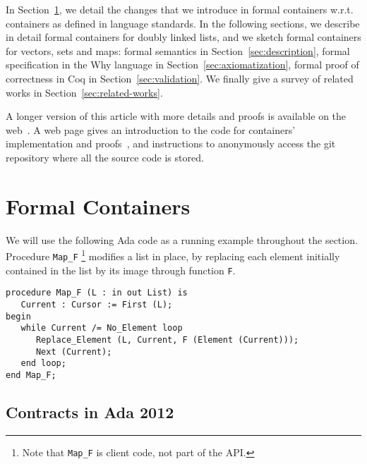 \documentclass[runningheads,a4paper]{llncs}
\newcommand{\wrt}{w.r.t.\xspace}
\newcommand{\beforesec}{\vspace{-0.2cm}}
\newcommand{\aftersec}{\vspace{-0.2cm}}
\newcommand{\beforesub}{\vspace{-0.2cm}}
\newcommand{\aftersub}{\vspace{-0.1cm}}
\begin{document}
In Section~\ref{sec:formal-containers}, we detail the changes that we introduce
in formal containers \wrt containers as defined in language standards. In the following
sections, we describe in detail formal containers for doubly linked lists, and
we sketch formal containers for vectors, sets and maps: formal semantics in
Section~\ref{sec:description}, formal specification in the Why language in
Section~\ref{sec:axiomatization}, formal proof of correctness in Coq in
Section~\ref{sec:validation}. We finally give a survey of related works in
Section~\ref{sec:related-works}.

A longer version of this article with more details and proofs is available on
the web~\cite{dross:2011:fc-long}.  A web page gives an introduction to the
code for containers' implementation and proofs~\cite{dross:2011:fc-code}, and
instructions to anonymously access the git repository where all the source code
is stored.


\beforesec
\section{Formal Containers}
\label{sec:formal-containers}
\aftersec

We will use the following Ada code as a running example throughout the
section. Procedure \verb|Map_F|
\footnote{Note that \texttt{Map\_F} is client code, not part of the API.}
%
modifies a list in place, by replacing each
element initially contained in the list by its image through function \verb|F|.
\lstset{language=Ada, basicstyle=\small\tt, keywordstyle=\normalfont\textbf}
\begin{lstlisting}
procedure Map_F (L : in out List) is
   Current : Cursor := First (L);
begin
   while Current /= No_Element loop
      Replace_Element (L, Current, F (Element (Current)));
      Next (Current);
   end loop;
end Map_F;
\end{lstlisting}

\beforesub
\subsection{Contracts in Ada 2012}
\aftersub
\end{document}

